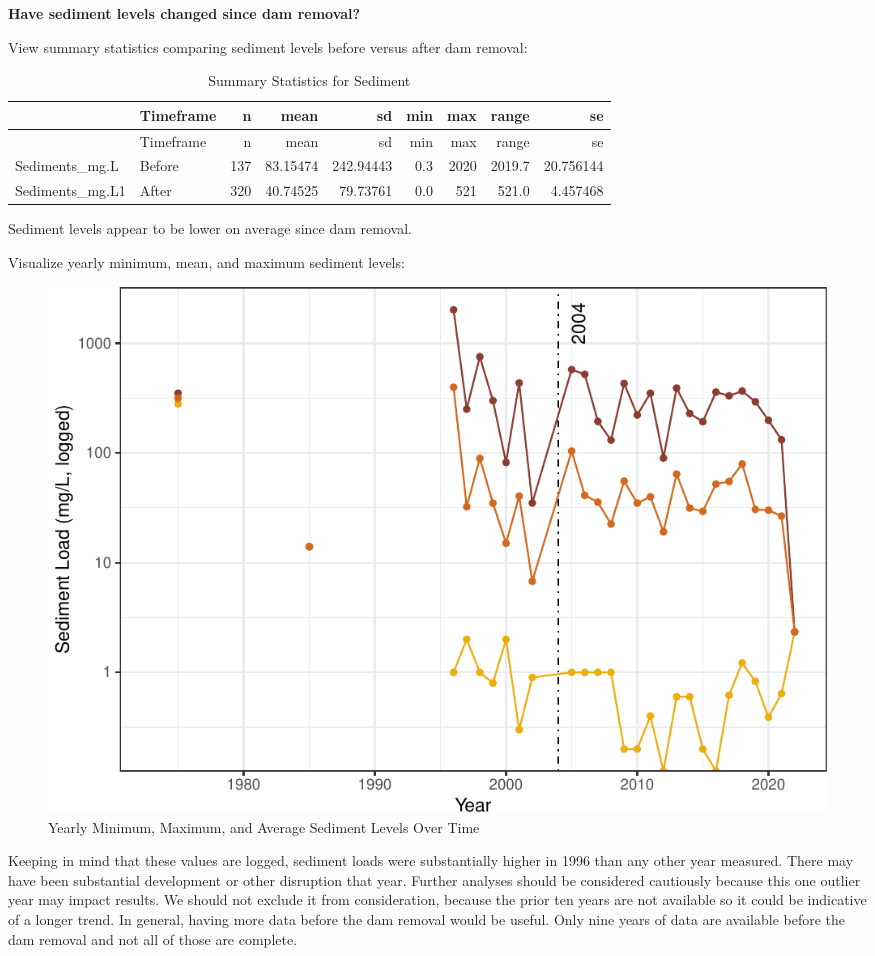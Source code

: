 \documentclass[
  12pt,
]{article}
\begin{document}
\textbf{Have sediment levels changed since dam removal?}

View summary statistics comparing sediment levels before versus after
dam removal:

\begin{longtable}[]{@{}llrrrrrrr@{}}
\caption{Summary Statistics for Sediment}\tabularnewline
\toprule
& Timeframe & n & mean & sd & min & max & range & se \\
\midrule
\endfirsthead
\toprule
& Timeframe & n & mean & sd & min & max & range & se \\
\midrule
\endhead
Sediments\_mg.L & Before & 137 & 83.15474 & 242.94443 & 0.3 & 2020 &
2019.7 & 20.756144 \\
Sediments\_mg.L1 & After & 320 & 40.74525 & 79.73761 & 0.0 & 521 & 521.0
& 4.457468 \\
\bottomrule
\end{longtable}

Sediment levels appear to be lower on average since dam removal.

Visualize yearly minimum, mean, and maximum sediment levels:

\begin{figure}
\centering
\includegraphics{Project_Script_files/figure-latex/Sediment_Analysis3-1.pdf}
\caption{Yearly Minimum, Maximum, and Average Sediment Levels Over Time}
\end{figure}

Keeping in mind that these values are logged, sediment loads were
substantially higher in 1996 than any other year measured. There may
have been substantial development or other disruption that year. Further
analyses should be considered cautiously because this one outlier year
may impact results. We should not exclude it from consideration, because
the prior ten years are not available so it could be indicative of a
longer trend. In general, having more data before the dam removal would
be useful. Only nine years of data are available before the dam removal
and not all of those are complete.
\end{document}
